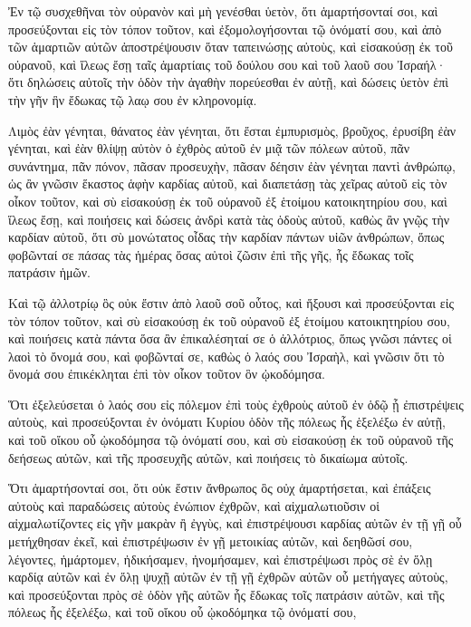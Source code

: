 {\par }{\PP {}Ἐν τῷ συσχεθῆναι τὸν οὐρανὸν καὶ μὴ γενέσθαι ὑετὸν, ὅτι ἁμαρτήσονταί σοι, καὶ προσεύξονται εἰς τὸν τόπον τοῦτον, καὶ ἐξομολογήσονται τῷ ὀνόματί σου, καὶ ἀπὸ τῶν ἁμαρτιῶν αὐτῶν ἀποστρέψουσιν ὅταν ταπεινώσῃς αὐτοὺς,
καὶ εἰσακούσῃ ἐκ τοῦ οὐρανοῦ, καὶ ἵλεως ἔσῃ ταῖς ἁμαρτίαις τοῦ δούλου σου καὶ τοῦ λαοῦ σου Ἰσραήλ· ὅτι δηλώσεις αὐτοῖς τὴν ὁδὸν τὴν ἀγαθὴν πορεύεσθαι ἐν αὐτῇ, καὶ δώσεις ὑετὸν ἐπὶ τὴν γῆν ἣν ἔδωκας τῷ λαῳ σου ἐν κληρονομίᾳ.
\par }{\PP {}Λιμὸς ἐὰν γένηται, θάνατος ἐὰν γένηται, ὅτι ἔσται ἐμπυρισμὸς, βροῦχος, ἐρυσίβη ἐὰν γένηται, καὶ ἐὰν θλίψῃ αὐτὸν ὁ ἐχθρὸς αὐτοῦ ἐν μιᾷ τῶν πόλεων αὐτοῦ, πᾶν συνάντημα, πᾶν πόνον,
πᾶσαν προσευχὴν, πᾶσαν δέησιν ἐὰν γένηται παντὶ ἀνθρώπῳ, ὡς ἂν γνῶσιν ἕκαστος ἁφὴν καρδίας αὐτοῦ, καὶ διαπετάσῃ τὰς χεῖρας αὐτοῦ εἰς τὸν οἶκον τοῦτον,
καὶ σὺ εἰσακούσῃ ἐκ τοῦ οὐρανοῦ ἐξ ἑτοίμου κατοικητηρίου σου, καὶ ἵλεως ἔσῃ, καὶ ποιήσεις καὶ δώσεις ἀνδρὶ κατὰ τὰς ὁδοὺς αὐτοῦ, καθὼς ἂν γνῷς τὴν καρδίαν αὐτοῦ, ὅτι σὺ μονώτατος οἶδας τὴν καρδίαν πάντων υἱῶν ἀνθρώπων,
ὅπως φοβῶνταί σε πάσας τὰς ἡμέρας ὅσας αὐτοὶ ζῶσιν ἐπὶ τῆς γῆς, ἧς ἔδωκας τοῖς πατράσιν ἡμῶν.
\par }{\PP {}Καὶ τῷ ἀλλοτρίῳ ὃς οὐκ ἔστιν ἀπὸ λαοῦ σοῦ οὗτος,
καὶ ἥξουσι καὶ προσεύξονται εἰς τὸν τόπον τοῦτον,
καὶ σὺ εἰσακούσῃ ἐκ τοῦ οὐρανοῦ ἐξ ἑτοίμου κατοικητηρίου σου, καὶ ποιήσεις κατὰ πάντα ὅσα ἂν ἐπικαλέσηταί σε ὁ ἀλλότριος, ὅπως γνῶσι πάντες οἱ λαοὶ τὸ ὄνομά σου, καὶ φοβῶνταί σε, καθὼς ὁ λαός σου Ἰσραὴλ, καὶ γνῶσιν ὅτι τὸ ὄνομά σου ἐπικέκληται ἐπὶ τὸν οἶκον τοῦτον ὃν ᾠκοδόμησα.
\par }{\PP {}Ὅτι ἐξελεύσεται ὁ λαός σου εἰς πόλεμον ἐπὶ τοὺς ἐχθροὺς αὐτοῦ ἐν ὁδῷ ᾗ ἐπιστρέψεις αὐτοὺς, καὶ προσεύξονται ἐν ὀνόματι Κυρίου ὁδὸν τῆς πόλεως ἧς ἑξελέξω ἐν αὐτῇ, καὶ τοῦ οἴκου οὗ ᾠκοδόμησα τῷ ὀνόματί σου,
καὶ σὺ εἰσακούσῃ ἐκ τοῦ οὐρανοῦ τῆς δεήσεως αὐτῶν, καὶ τῆς προσευχῆς αὐτῶν, καὶ ποιήσεις τὸ δικαίωμα αὐτοῖς.
\par }{\PP {}Ὅτι ἁμαρτήσονταί σοι, ὅτι οὐκ ἔστιν ἄνθρωπος ὃς οὐχ ἁμαρτήσεται, καὶ ἐπάξεις αὐτοὺς καὶ παραδώσεις αὐτοὺς ἐνώπιον ἐχθρῶν, καὶ αἰχμαλωτιοῦσιν οἱ αἰχμαλωτίζοντες εἰς γῆν μακρὰν ἢ ἐγγὺς,
καὶ ἐπιστρέψουσι καρδίας αὐτῶν ἐν τῇ γῇ οὗ μετήχθησαν ἐκεῖ, καὶ ἐπιστρέψωσιν ἐν γῇ μετοικίας αὐτῶν, καὶ δεηθῶσί σου, λέγοντες, ἡμάρτομεν, ἠδικήσαμεν, ἠνομήσαμεν,
καὶ ἐπιστρέψωσι πρὸς σὲ ἐν ὅλῃ καρδίᾳ αὐτῶν καὶ ἐν ὅλῃ ψυχῇ αὐτῶν ἐν τῇ γῇ ἐχθρῶν αὐτῶν οὗ μετήγαγες αὐτοὺς, καὶ προσεύξονται πρὸς σὲ ὁδὸν γῆς αὐτῶν ἧς ἔδωκας τοῖς πατράσιν αὐτῶν, καὶ τῆς πόλεως ἧς ἐξελέξω, καὶ τοῦ οἴκου οὗ ᾠκοδόμηκα τῷ ὀνόματί σου,
}

